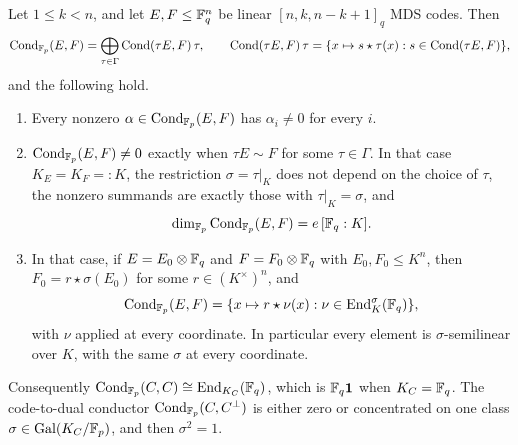 \begin{proposition}
\label{prop:additive-conductor}
Let \(1\leq k<n\), and let \(E,F\leq\mathbb F_q^n\) be linear
\([n,k,n-k+1]_q\) MDS codes.  Then
\begin{equation}\label{eq:galois-sector-decomposition}
 \operatorname{Cond}_{\mathbb F_p}(E,F)=\bigoplus_{\tau\in\Gamma}\operatorname{Cond}(\tau E,F)\,\tau,
 \qquad
 \operatorname{Cond}(\tau E,F)\,\tau=\{x\mapsto s\star\tau(x):s\in\operatorname{Cond}(\tau E,F)\},
\end{equation}
and the following hold.
\begin{enumerate}
\item Every nonzero \(\alpha\in\operatorname{Cond}_{\mathbb F_p}(E,F)\) has \(\alpha_i\ne0\) for
  every \(i\).
\item \(\operatorname{Cond}_{\mathbb F_p}(E,F)\ne0\) exactly when \(\tau E\sim F\) for some
  \(\tau\in\Gamma\).  In that case \(K_E=K_F=:K\), the restriction
  \(\sigma=\tau|_K\) does not depend on the choice of \(\tau\), the nonzero
  summands are exactly those with \(\tau|_K=\sigma\), and
  \[
   \dim_{\mathbb F_p}\operatorname{Cond}_{\mathbb F_p}(E,F)=e\,[\mathbb F_q:K].
  \]
\item In that case, if \(E=E_0\otimes\mathbb F_q\) and \(F=F_0\otimes\mathbb F_q\) with
  \(E_0,F_0\leq K^n\), then \(F_0=r\star\sigma(E_0)\) for some
  \(r\in(K^\times)^n\), and
  \[
   \operatorname{Cond}_{\mathbb F_p}(E,F)=\{x\mapsto r\star\nu(x):\nu\in\operatorname{End}_K^\sigma(\mathbb F_q)\},
  \]
  with \(\nu\) applied at every coordinate.  In particular every element is
  \(\sigma\)-semilinear over \(K\), with the same \(\sigma\) at every
  coordinate.
\end{enumerate}
Consequently \(\operatorname{Cond}_{\mathbb F_p}(C,C)\cong\operatorname{End}_{K_C}(\mathbb F_q)\), which is
\(\mathbb F_q\mathbf1\) when \(K_C=\mathbb F_q\).  The code-to-dual conductor
\(\operatorname{Cond}_{\mathbb F_p}(C,C^\perp)\) is either zero or concentrated on one class
\(\sigma\in\mathrm{Gal}(K_C/\mathbb F_p)\), and then \(\sigma^2=1\).
\end{proposition}

